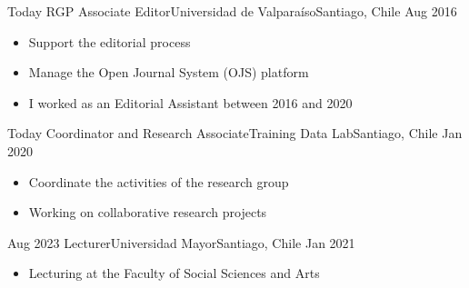 





\begin{experiences}
  \experience
    {Today} {RGP Associate Editor}{Universidad de Valparaíso}{Santiago, Chile} {Aug 2016}
    {\begin{itemize}
    \item Support the editorial process
    \item Manage the Open Journal System (OJS) platform 
    \item I worked as an Editorial Assistant between 2016 and 2020
    \end{itemize}}
    {}
\end{experiences}
\vspace{-2mm}

\begin{experiences}
  \experience
    {Today} {Coordinator and Research Associate}{Training Data Lab}{Santiago, Chile} {Jan 2020}
    {\begin{itemize}
    \item Coordinate the activities of the research group
    \item Working on collaborative research projects
    \end{itemize}}
    {}
\end{experiences}
\vspace{-2mm}

\begin{experiences}
  \emptySeparator 
  \experience 
    {Aug 2023} {Lecturer}{Universidad Mayor}{Santiago, Chile} {Jan 2021}
    {\begin{itemize}
    \item Lecturing at the Faculty of Social Sciences and Arts
    \end{itemize}}
    {}
\end{experiences}
\vspace{-2mm}

